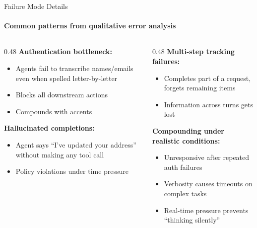 \documentclass[aspectratio=169]{beamer}
\begin{document}

\begin{frame}{Failure Mode Details}
  \framesubtitle{Common patterns from qualitative error analysis}

  \begin{columns}[T]
    \begin{column}{0.48\textwidth}
      \textbf{Authentication bottleneck:}
      \begin{itemize}
        \item Agents fail to transcribe names/emails even when spelled letter-by-letter
        \item Blocks all downstream actions
        \item Compounds with accents
      \end{itemize}

      \vspace{0.5em}
      \textbf{Hallucinated completions:}
      \begin{itemize}
        \item Agent says ``I've updated your address'' without making any tool call
        \item Policy violations under time pressure
      \end{itemize}
    \end{column}
    \begin{column}{0.48\textwidth}
      \textbf{Multi-step tracking failures:}
      \begin{itemize}
        \item Completes part of a request, forgets remaining items
        \item Information across turns gets lost
      \end{itemize}

      \vspace{0.5em}
      \textbf{Compounding under realistic conditions:}
      \begin{itemize}
        \item Unresponsive after repeated auth failures
        \item Verbosity causes timeouts on complex tasks
        \item Real-time pressure prevents ``thinking silently''
      \end{itemize}
    \end{column}
  \end{columns}

\end{frame}
\end{document}
